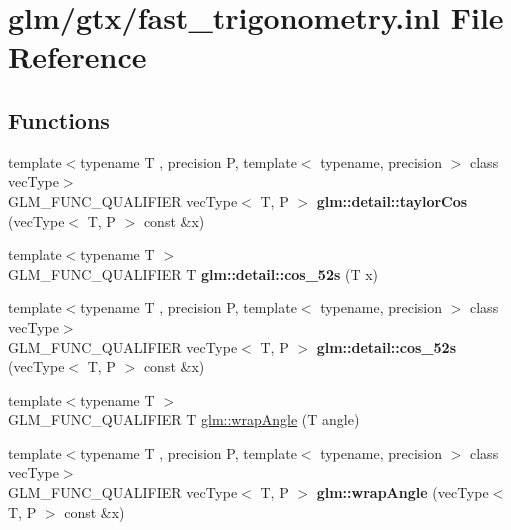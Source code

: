 \hypertarget{fast__trigonometry_8inl}{\section{glm/gtx/fast\-\_\-trigonometry.inl File Reference}
\label{fast__trigonometry_8inl}
}
\subsection*{Functions}
\begin{DoxyCompactItemize}
\item 
\hypertarget{namespaceglm_1_1detail_a4a16281a64def18b20ab307b516095c2}{{\footnotesize template$<$typename T , precision P, template$<$ typename, precision $>$ class vec\-Type$>$ }\\G\-L\-M\-\_\-\-F\-U\-N\-C\-\_\-\-Q\-U\-A\-L\-I\-F\-I\-E\-R vec\-Type$<$ T, P $>$ {\bfseries glm\-::detail\-::taylor\-Cos} (vec\-Type$<$ T, P $>$ const \&x)}\label{namespaceglm_1_1detail_a4a16281a64def18b20ab307b516095c2}

\item 
\hypertarget{namespaceglm_1_1detail_a09055f8d723109dc95c8cc2309e20acc}{{\footnotesize template$<$typename T $>$ }\\G\-L\-M\-\_\-\-F\-U\-N\-C\-\_\-\-Q\-U\-A\-L\-I\-F\-I\-E\-R T {\bfseries glm\-::detail\-::cos\-\_\-52s} (T x)}\label{namespaceglm_1_1detail_a09055f8d723109dc95c8cc2309e20acc}

\item 
\hypertarget{namespaceglm_1_1detail_ad0c49f46dc1033d16811b2b90f1dcc64}{{\footnotesize template$<$typename T , precision P, template$<$ typename, precision $>$ class vec\-Type$>$ }\\G\-L\-M\-\_\-\-F\-U\-N\-C\-\_\-\-Q\-U\-A\-L\-I\-F\-I\-E\-R vec\-Type$<$ T, P $>$ {\bfseries glm\-::detail\-::cos\-\_\-52s} (vec\-Type$<$ T, P $>$ const \&x)}\label{namespaceglm_1_1detail_ad0c49f46dc1033d16811b2b90f1dcc64}

\item 
{\footnotesize template$<$typename T $>$ }\\G\-L\-M\-\_\-\-F\-U\-N\-C\-\_\-\-Q\-U\-A\-L\-I\-F\-I\-E\-R T \hyperlink{group__gtx__fast__trigonometry_ga069527c6dbd64f53435b8ebc4878b473}{glm\-::wrap\-Angle} (T angle)
\item 
\hypertarget{namespaceglm_a643ff6d35f2ea3652029cf4197ca900e}{{\footnotesize template$<$typename T , precision P, template$<$ typename, precision $>$ class vec\-Type$>$ }\\G\-L\-M\-\_\-\-F\-U\-N\-C\-\_\-\-Q\-U\-A\-L\-I\-F\-I\-E\-R vec\-Type$<$ T, P $>$ {\bfseries glm\-::wrap\-Angle} (vec\-Type$<$ T, P $>$ const \&x)}\label{namespaceglm_a643ff6d35f2ea3652029cf4197ca900e}


\end{DoxyCompactItemize}
